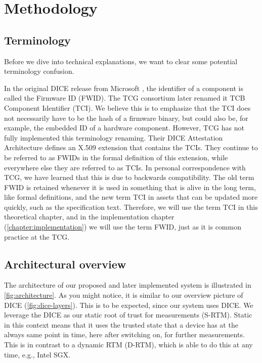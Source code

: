 
\chapter{Methodology}\label{chapter:methodology}

\section{Terminology}
\label{sec:terminology}

Before we dive into technical explanations, we want to clear some potential terminology confusion.

In the original DICE release from Microsoft \cite{England2016}, the identifier of a component is called the Firmware ID (FWID).
The TCG consortium later renamed it TCB Component Identifier (TCI).
We believe this is to emphasize that the TCI does not necessarily have to be the hash of a firmware binary, but could also be, for example, the embedded ID of a hardware component.
However, TCG has not fully implemented this terminology renaming.
Their DICE Attestation Architecture \cite{TCGAttestation2021} defines an X.509 extension that contains the TCIs.
They continue to be referred to as FWIDs in the formal definition of this extension, while everywhere else they are referred to as TCIs.
In personal correspondence with TCG, we have learned that this is due to backwards compatibility.
The old term FWID is retained whenever it is used in something that is alive in the long term, like formal definitions, and the new term TCI in assets that can be updated more quickly, such as the specification text.
Therefore, we will use the term TCI in this theoretical chapter, and in the implementation chapter (\autoref{chapter:implementation}) we will use the term FWID, just as it is common practice at the TCG.



\section{Architectural overview}



The architecture of our proposed and later implemented system is illustrated in \autoref{fig:architecture}.
As you might notice, it is similar to our overview picture of DICE (\autoref{fig:dice-layers}).
This is to be expected, since our system uses DICE.
We leverage the DICE as our static root of trust for measurements (S-RTM).
Static in this context means that it uses the trusted state that a device has at the always same point in time, here after switching on, for further measurements.
This is in contrast to a dynamic RTM (D-RTM), which is able to do this at any time, e.g., Intel SGX.

